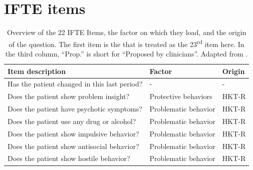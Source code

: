 \documentclass[a4paper,11pt]{article}
\begin{document}
\section{IFTE items}
\begin{table}[!ht]
    \centering
    \caption{%
 	Overview of the 22 IFTE Items, the factor on which they load, and the origin of the question. 
 	The first item is the that is treated as the 23\textsuperscript{rd} item here. 
 	In the third column, ``Prop.'' is short for ``Proposed by clinicians''.
 	Adapted from \textcite{schuringa2014inter}.
 	}
 	\label{tb:IFTE_items}
 	\begin{tabular}{>{\small}lll}
 	\toprule
    Item description                                                                                        &   Factor                  &   Origin                  \\
\midrule
    Has the patient changed in this last period?                                                            &   -                       &   -                       \\
    Does the patient show problem insight?                                                                  &   Protective behaviors    &   HKT-R                   \\
    Does the patient have psychotic symptoms?                                                               &   Problematic behavior    &   HKT-R                   \\
    Does the patient use any drug or alcohol?                                                               &   Problematic behavior    &   HKT-R                   \\
    Does the patient show impulsive behavior?                                                               &   Problematic behavior    &   HKT-R                   \\
    Does the patient show antisocial behavior?                                                              &   Problematic behavior    &   HKT-R                   \\
    Does the patient show hostile behavior?                                                                 &   Problematic behavior    &   HKT-R                   \\

\end{tabular}
\end{table}
\end{document}
